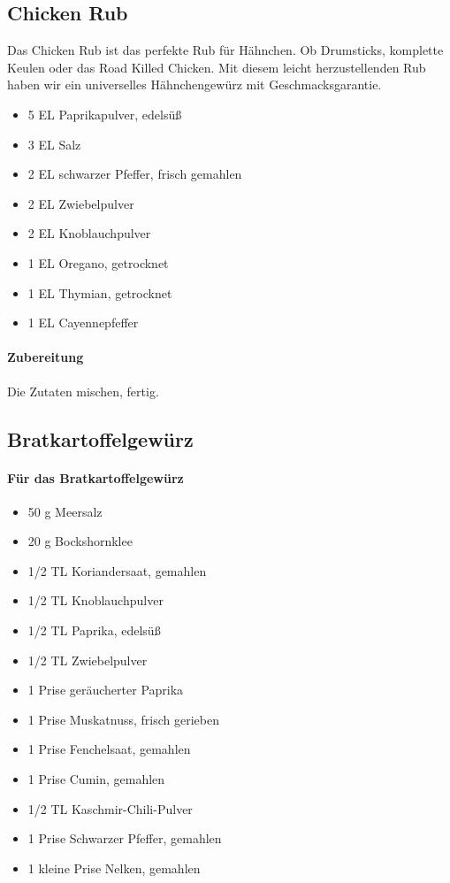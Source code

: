 \subsection{Chicken Rub}\label{Chicken}
Das Chicken Rub ist das perfekte Rub für Hähnchen. Ob Drumsticks, komplette 
Keulen oder das Road Killed Chicken. Mit diesem leicht herzustellenden Rub 
haben wir ein universelles Hähnchengewürz mit Geschmacksgarantie.

\begin{itemize}[noitemsep]
	\item 5 EL Paprikapulver, edelsüß
	\item 3 EL Salz
	\item 2 EL schwarzer Pfeffer, frisch gemahlen
	\item 2 EL Zwiebelpulver
	\item 2 EL Knoblauchpulver
	\item 1 EL Oregano, getrocknet
	\item 1 EL Thymian, getrocknet
	\item 1 EL Cayennepfeffer
\end{itemize}

\paragraph{Zubereitung}

Die Zutaten mischen, fertig.

\subsection{Bratkartoffelgewürz}

\paragraph{Für das Bratkartoffelgewürz}\label{Bratkartoffelgewürz}

\begin{itemize}[noitemsep]
	\item 50 g Meersalz
	\item 20 g Bockshornklee
	\item 1/2 TL Koriandersaat, gemahlen
	\item 1/2 TL  Knoblauchpulver
	\item 1/2 TL  Paprika, edelsüß
	\item 1/2 TL Zwiebelpulver
	\item 1 Prise geräucherter Paprika
	\item 1 Prise Muskatnuss, frisch gerieben
	\item 1 Prise Fenchelsaat, gemahlen
	\item 1 Prise Cumin, gemahlen
	\item 1/2 TL Kaschmir-Chili-Pulver
	\item 1 Prise Schwarzer Pfeffer, gemahlen
	\item 1 kleine Prise Nelken, gemahlen
\end{itemize}

